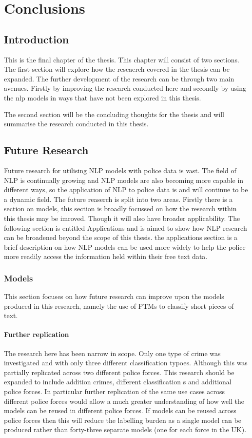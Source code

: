 \chapter{Conclusions}

\section{Introduction} This is the final chapter of the thesis. This chapter will consist of two sections. The first section will explore how the reseaerch covered in the thesis can be expanded. The  further development of the research can be through two main avenues. Firstly by improving the research conducted here and secondly by using the nlp models in ways that have not been explored in this thesis. 

The second section will be the concluding thoughts for the thesis and will summarise the research conducted in this thesis. 

\section{Future Research} Future research for utilising NLP models with police data is vast. The field of NLP is continually growing and NLP models are also becoming more capable in different ways, so the application of NLP to police data is and will continue to be a dynamic field. The future reaserch is split into two areas. Firstly there is a section on models, this section is broadly focussed on how the research within this thesis may be imroved. Though it will also have broader applicability. The following section is entitled Applications and is aimed to show how NLP research can be broadened beyond the scope of this thesis.  the applications section is a brief description on how NLP models can be used more widely to help the police more readily access the information held within their free text data. 

\subsection{Models}  This section focuses on how future research can improve upon the models produced in this research, namely the use of PTMs to classify short pieces of text.

\subsubsection{Further replication} The research here has been narrow in scope. Only one type of crime was investigated and with only three different classification typoes. Although this was partially replicated across two different police forces.  This research should be expanded to include addition crimes, different classification s and additional police forces. In particular further replication of the same use cases across different police forces would allow a much greater understanding of how well the models can be reused in different police forces. If models can be reused across police forces then this will reduce the labelling burden as a single model can be produced rather than forty-three separate models (one for each force in the UK). 

